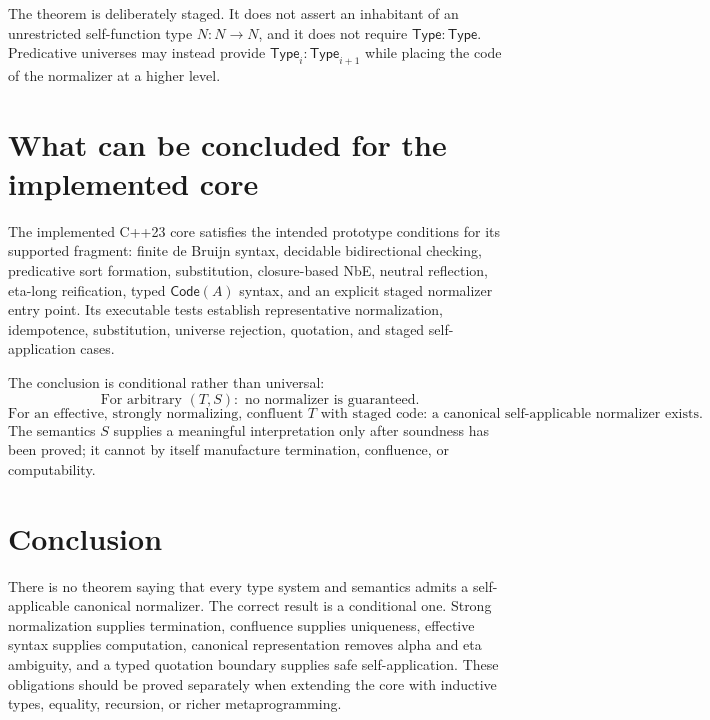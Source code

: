 \documentclass[11pt,a4paper]{article}
\newcommand{\Ty}{\mathsf{Type}}
\newcommand{\Code}{\mathsf{Code}}
\begin{document}
The theorem is deliberately staged. It does not assert an inhabitant of an unrestricted self-function type $N:N\to N$, and it does not require $\Ty:\Ty$. Predicative universes may instead provide $\Ty_i:\Ty_{i+1}$ while placing the code of the normalizer at a higher level.

\section{What can be concluded for the implemented core}
The implemented C++23 core satisfies the intended prototype conditions for its supported fragment: finite de Bruijn syntax, decidable bidirectional checking, predicative sort formation, substitution, closure-based NbE, neutral reflection, eta-long reification, typed $\Code(A)$ syntax, and an explicit staged normalizer entry point. Its executable tests establish representative normalization, idempotence, substitution, universe rejection, quotation, and staged self-application cases.

The conclusion is conditional rather than universal:
\[
\boxed{\text{For arbitrary }(T,S):\text{ no normalizer is guaranteed.}}
\]
\[
\boxed{\text{For an effective, strongly normalizing, confluent }T\text{ with staged code: a canonical self-applicable normalizer exists.}}
\]
The semantics $S$ supplies a meaningful interpretation only after soundness has been proved; it cannot by itself manufacture termination, confluence, or computability.

\section{Conclusion}
There is no theorem saying that every type system and semantics admits a self-applicable canonical normalizer. The correct result is a conditional one. Strong normalization supplies termination, confluence supplies uniqueness, effective syntax supplies computation, canonical representation removes alpha and eta ambiguity, and a typed quotation boundary supplies safe self-application. These obligations should be proved separately when extending the core with inductive types, equality, recursion, or richer metaprogramming.
\end{document}
